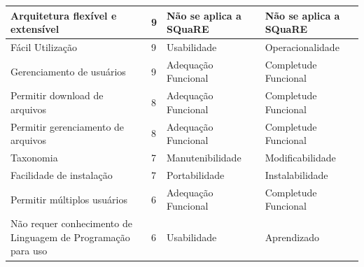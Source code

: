 \begin{apendicesenv}
\begin{longtable}{|p{175pt}|p{18pt}|p{110pt}|p{120pt}|}
 {\raggedright Arquitetura flexível e extensível}
  	 	  	 & {\raggedright {9}}
  	 	   & {\raggedright {Não se aplica a SQuaRE}}
  	 	   & {\raggedright {Não se aplica a SQuaRE}}\\
  	 	  	 	\hline

{\raggedright {Fácil Utilização}}
  	 	 & {\raggedright {9}}
  	 	 & {\raggedright {Usabilidade}}
  	 	 & {\raggedright {Operacionalidade}}\\
  	 	\hline

 {\raggedright {Gerenciamento de usuários}}
  	 	 & {\raggedright {9}}
  	 	 & {\raggedright {Adequação Funcional}}
  	 	 & {\raggedright {Completude Funcional}}\\
  	 	\hline

 {\raggedright {Permitir download de arquivos}}
  	 	 & {\raggedright {8}}
  	 	 & {\raggedright {Adequação Funcional}}
  	 	 & {\raggedright {Completude Funcional}}\\
  	 	\hline
 {\raggedright {Permitir gerenciamento de arquivos}}
  	 	 & {\raggedright {8}}
  	 	 & {\raggedright {Adequação Funcional}}
  	 	 & {\raggedright {Completude Funcional}}\\
  	 	\hline
{\raggedright {Taxonomia}}
  	 	 & {\raggedright {7}}
  	 	 & {\raggedright {Manutenibilidade}}
  	 	 & {\raggedright {Modificabilidade}}\\
  	 	\hline
 



 
{\raggedright {Facilidade de instalação}}
  	 	 & {\raggedright {7}}
  	 	 & {\raggedright {Portabilidade}}
  	 	 & {\raggedright {Instalabilidade}}\\
  	 	\hline
{\raggedright {Permitir múltiplos usuários}}
  	 	 & {\raggedright {6}}
  	 	 
  	 	 & {\raggedright {Adequação Funcional}}
  	 	 & {\raggedright {Completude Funcional}}\\
  	 	\hline
{\raggedright {Não requer conhecimento de Linguagem de Programação para uso}}
  	 	 & {\raggedright {6}}
  	 	 & {\raggedright {Usabilidade}}
  	 	 & {\raggedright {Aprendizado}}\\
  	 	\hline
  	 	

\end{longtable}
\end{apendicesenv}
